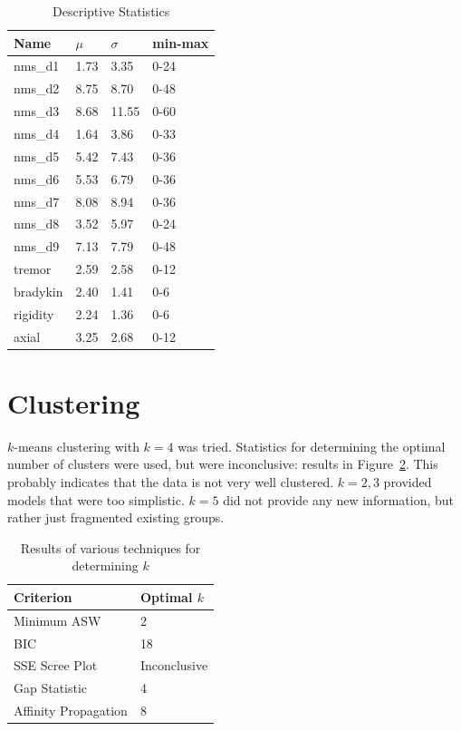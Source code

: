 \documentclass[10pt]{article}
\begin{document}
\begin{table}[h]
  \centering
  \begin{tabular}{l|l|l|l}
  Name  &       $\mu$ & $\sigma$ & min-max \\
         \hline
nms\_d1&   1.73&  3.35&   0-24 \\
nms\_d2&   8.75&  8.70&   0-48 \\
nms\_d3&   8.68& 11.55&   0-60 \\
nms\_d4&   1.64&  3.86&   0-33 \\
nms\_d5&   5.42&  7.43&   0-36 \\
nms\_d6&   5.53&  6.79&   0-36 \\
nms\_d7&   8.08&  8.94&   0-36 \\
nms\_d8&   3.52&  5.97&   0-24 \\
nms\_d9&   7.13&  7.79&   0-48 \\
tremor&   2.59&  2.58&   0-12 \\
bradykin& 2.40&  1.41&   0-6 \\
rigidity& 2.24&  1.36&   0-6 \\
axial&    3.25&  2.68&   0-12 \\
  \end{tabular}
  \caption{Descriptive Statistics}
  \label{tab:descriptive-statistics}
\end{table}

\section{Clustering}

$k$-means clustering with $k = 4$ was tried. Statistics for determining the
optimal number of clusters were used, but were inconclusive: results in
Figure~\ref{tab:numclus}. This probably indicates that the data is not very
well clustered. $k = 2, 3$ provided models that were too simplistic. $k = 5$
did not provide any new information, but rather just fragmented existing
groups.
\begin{table}[h]
  \centering
  \begin{tabular}{l|l}
    Criterion & Optimal $k$ \\
    \hline
    Minimum ASW & 2 \\
    BIC & 18 \\
    SSE Scree Plot & Inconclusive \\
    Gap Statistic & 4 \\
    Affinity Propagation & 8 \\%


  \end{tabular}
  \caption{Results of various techniques for determining $k$}
  \label{tab:numclus}
\end{table}
\end{document}
